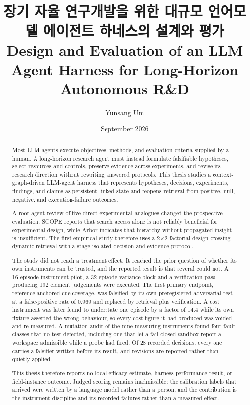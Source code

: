 \documentclass[11pt,a4paper]{article}
\title{장기 자율 연구개발을 위한 대규모 언어모델 에이전트 하네스의 설계와 평가\\
\large Design and Evaluation of an LLM Agent Harness for Long-Horizon Autonomous R\&D}
\author{Yunsang Um}
\date{September 2026}
\begin{document}
\maketitle

\begin{abstract}
Most LLM agents execute objectives, methods, and evaluation criteria supplied by
a human.  A long-horizon research agent must instead formulate falsifiable
hypotheses, select resources and controls, preserve evidence across experiments,
and revise its research direction without rewriting answered protocols.  This
thesis studies a context-graph-driven LLM-agent harness that represents
hypotheses, decisions, experiments, findings, and claims as persistent linked
state and reopens retrieval from positive, null, negative, and execution-failure
outcomes.

A root-agent review of five direct experimental analogues changed the prospective
evaluation.  SCOPE reports that search access alone is not reliably beneficial
for experimental design, while Arbor indicates that hierarchy without propagated
insight is insufficient.  The first empirical study therefore uses a 2$\times$2
factorial design crossing dynamic retrieval with a stage-isolated decision and
evidence protocol.

The study did not reach a treatment effect.  It reached the prior question of
whether its own instruments can be trusted, and the reported result is that
several could not.  A 16-episode instrument pilot, a 32-episode variance block
and a verification pass producing 192 element judgements were executed.  The
first primary endpoint, reference-anchored cue coverage, was falsified by its own
preregistered adversarial test at a false-positive rate of 0.969 and replaced by
retrieval plus verification.  A cost instrument was later found to understate one
episode by a factor of 14.4 while its own fixture asserted the wrong behaviour, so
every cost figure it had produced was voided and re-measured.  A mutation audit of
the nine measuring instruments found four fault classes that no test detected,
including one that let a fail-closed sandbox report a workspace admissible while a
probe had fired.  Of 28 recorded decisions, every one carries a falsifier written
before its result, and revisions are reported rather than quietly applied.

This thesis therefore reports no local efficacy estimate, harness-performance
result, or field-instance outcome.  Judged scoring remains inadmissible: the calibration labels that arrived were written by a language model rather than a person, and the contribution is the instrument discipline and its recorded failures rather than a measured effect.
\end{abstract}
\end{document}
